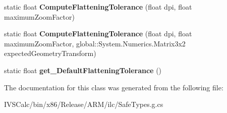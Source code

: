 \begin{DoxyCompactItemize}
\item 
\mbox{\label{class_microsoft_1_1_graphics_1_1_canvas_1_1_geometry_1_1_canvas_geometry_af0a58e1e6450e34081143a65770bb043}} 
static float {\bfseries Compute\+Flattening\+Tolerance} (float dpi, float maximum\+Zoom\+Factor)
\item 
\mbox{\label{class_microsoft_1_1_graphics_1_1_canvas_1_1_geometry_1_1_canvas_geometry_a4cab7234385475a4109d2dcdca24ca39}} 
static float {\bfseries Compute\+Flattening\+Tolerance} (float dpi, float maximum\+Zoom\+Factor, global\+::\+System.\+Numerics.\+Matrix3x2 expected\+Geometry\+Transform)
\item 
\mbox{\label{class_microsoft_1_1_graphics_1_1_canvas_1_1_geometry_1_1_canvas_geometry_aec4a5123b972fd4576fdd3ab85f59718}} 
static float {\bfseries get\+\_\+\+Default\+Flattening\+Tolerance} ()
\end{DoxyCompactItemize}


The documentation for this class was generated from the following file\+:\begin{DoxyCompactItemize}
\item 
I\+V\+S\+Calc/bin/x86/\+Release/\+A\+R\+M/ilc/Safe\+Types.\+g.\+cs\end{DoxyCompactItemize}
